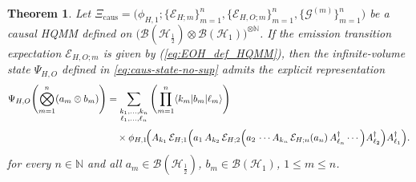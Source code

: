 \documentclass[11pt,a4paper]{article}
\newtheorem{theorem}{Theorem}[section]
\begin{document}
 \begin{theorem}
\label{thm:causal-state-kraus}
Let $\Xi_{\mathrm{caus}} = \bigl(\phi_{H,1}; \{\mathcal{E}_{H;m}\}_{m=1}^{n}, \{\mathcal{E}_{H,O;m}\}_{m=1}^{n}, \{\mathcal{G}^{(m)}\}_{m=1}^{n}\bigr)$ be a causal HQMM defined on $\bigl(\mathcal{B}(\mathcal{H}_{\frac{1}{2}})\otimes \mathcal{B}(\mathcal{H}_{1})\bigr)^{\otimes \mathbb{N}}$. If the emission transition expectation $\mathcal{E}_{H,O;m}$ is given by \textnormal{(\ref{eq:EOH_def_HQMM})}, then the infinite-volume state $\Psi_{H,O}$ defined in \textnormal{\eqref{eq:caus-state-no-sup}} admits the explicit representation
\begin{align}
\Psi_{H,O}\!\left(\bigotimes_{m=1}^n (a_m\otimes b_m)\right)
&=
\sum_{\substack{k_1,\dots,k_n\\ \ell_1,\dots,\ell_n}}
\left(\prod_{m=1}^n \langle k_m|b_m|\ell_m\rangle\right)
\nonumber\\[0.3em]
&\quad\times
\phi_{H,1}\!\Bigl(
A_{k_1}\,
\mathcal{E}_{H;1}\Bigl(
a_1\,
A_{k_2}\,
\mathcal{E}_{H;2}\Bigl(
a_2\,
\cdots
A_{k_n}\,\mathcal{E}_{H;n}(a_n)\,
A_{\ell_n}^\dagger
\cdots
\Bigr)
A_{\ell_2}^\dagger
\Bigr)
A_{\ell_1}^\dagger
\Bigr).
\label{eq:psi-explicit-compact2}
\end{align}
for every $n\in\mathbb{N}$ and all $a_m\in \mathcal{B}(\mathcal{H}_{\frac{1}{2}})$, $b_m\in \mathcal{B}(\mathcal{H}_{1})$, $1\le m\le n$.
\end{theorem}
\end{document}
